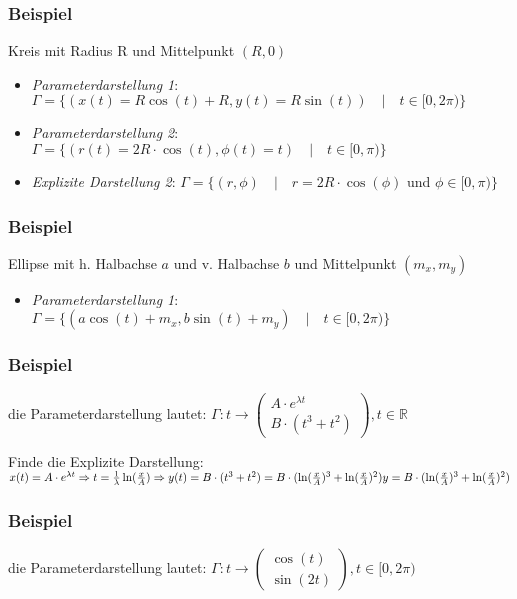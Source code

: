 \documentclass[11pt]{article} %
\begin{document}
\subsubsection{Beispiel}
Kreis mit Radius R und Mittelpunkt $(R,0)$
\begin{itemize}
\item \emph{Parameterdarstellung 1}: $\Gamma = \{(x(t) = R\cos (t)+ R, y(t) = R\sin (t)) \quad | \quad t \in [0,2\pi) \}$
\item \emph{Parameterdarstellung 2}: $\Gamma = \{(r(t) = 2R\cdot \cos(t),\phi(t)= t) \quad | \quad t \in [0,\pi) \}$
\item \emph{Explizite Darstellung 2}: $\Gamma = \{(r,\phi) \quad | \quad r = 2R\cdot \cos(\phi) $ und $ \phi \in [0,\pi)\}$
\end{itemize}

\subsubsection{Beispiel}
Ellipse mit h. Halbachse $a$ und v. Halbachse $b$ und Mittelpunkt $(m_x, m_y)$
\begin{itemize}
\item \emph{Parameterdarstellung 1}: $\Gamma = \{(a\cos (t)+m_x,b\sin (t)+m_y) \quad | \quad t \in [0,2\pi) \}$
\end{itemize}

\subsubsection{Beispiel}
die Parameterdarstellung lautet:
$\Gamma: t \rightarrow  \left(\!
    \begin{array}{c}
       A\cdot e^{\lambda t}\\
     B \cdot (t^3 + t^2)
    \end{array}
  \!\right) , t \in \mathbb{R}$

Finde die Explizite Darstellung:\\

$x(t) = A\cdot e^{\lambda t} \Rightarrow t = \frac{1}{\lambda}\ln(\frac{x}{A})\\
\Rightarrow y(t) = B\cdot(t^3 + t^2) = B\cdot(\ln(\frac{x}{A})^3 + \ln(\frac{x}{A})^2)\\
y = B\cdot(\ln(\frac{x}{A})^3 + \ln(\frac{x}{A})^2)$

\subsubsection{Beispiel}
die Parameterdarstellung lautet:
$\Gamma: t \rightarrow  \left(\!
    \begin{array}{c}
       \cos(t)\\
     \sin(2t)
    \end{array}
  \!\right) , t \in [0,2\pi)$
\end{document}
